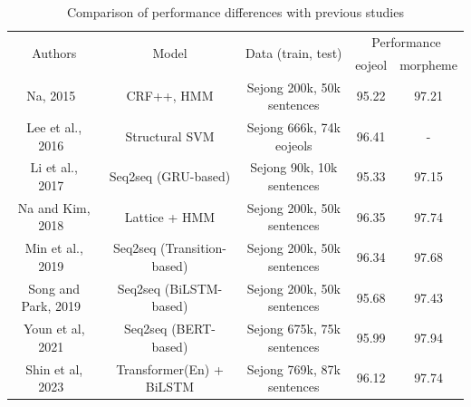 \documentclass[AMS,STIX2COL]{WileyNJD-v2}
\begin{document}
    \begin{table}[]
        \caption{Comparison of performance differences with previous studies}\label{tab:differences-with-previous-studies}
        \begin{tabular*}{500pt}{@{\extracolsep\fill}ccc|cc@{\extracolsep\fill}}
            \toprule
            \multirow{2}{*}{Authors} & \multirow{2}{*}{Model} & \multirow{2}{*}{Data (train, test)} & \multicolumn{2}{c}{Performance} \\
            \cmidrule{4-5}
            ~                                     & ~                                          & ~                                           & \multicolumn{1}{c}{eojeol} & \multicolumn{1}{c}{morpheme} \\
            \midrule
            Na, 2015~\cite{NaSH2015}              & CRF++, HMM                                 & Sejong 200k, 50k sentences                  & 95.22                      & 97.21                        \\
            Lee et al., 2016~\cite{LeeCH2016}     & Structural SVM                             & Sejong 666k, 74k eojeols                    & 96.41                      & -                            \\
            Li et al., 2017~\cite{Li2017}         & Seq2seq (GRU-based)                        & Sejong 90k, 10k sentences                   & 95.33                      & 97.15                        \\
            Na and Kim, 2018~\cite{NaSH2018}      & Lattice + HMM                              & Sejong 200k, 50k sentences                  & 96.35                      & 97.74                        \\
            Min et al., 2019~\cite{MinJW2019}     & Seq2seq (Transition-based)                 & Sejong 200k, 50k sentences                  & 96.34                      & 97.68                        \\
            Song and Park, 2019~\cite{SongHJ2019} & Seq2seq (BiLSTM-based)                     & Sejong 200k, 50k sentences                  & 95.68                      & 97.43                        \\
            Youn et al, 2021~\cite{YounJY2021}    & Seq2seq (BERT-based)                       & Sejong 675k, 75k sentences                  & 95.99                      & 97.94                        \\
            Shin et al, 2023~\cite{ShinHJ2023}    & Transformer(En) + BiLSTM                   & Sejong 769k, 87k sentences                  & 96.12                      & 97.74                        \\

\end{tabular*}
\end{table}
\end{document}
